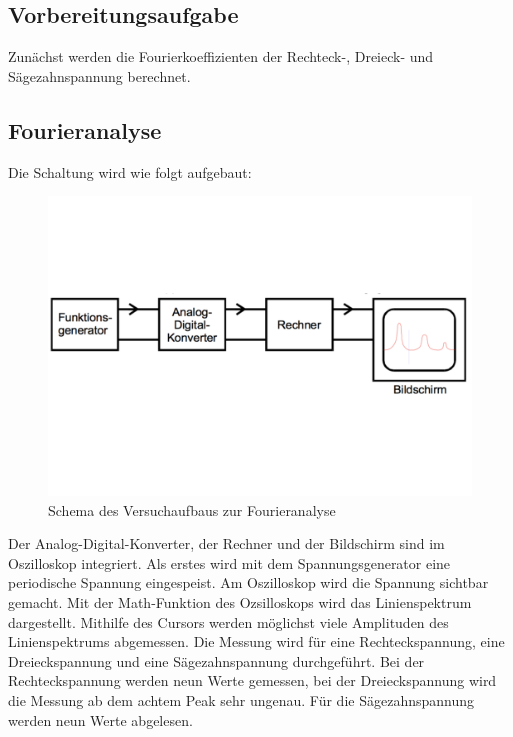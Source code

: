\subsection{Vorbereitungsaufgabe}
Zunächst werden die Fourierkoeffizienten der Rechteck-, Dreieck- und Sägezahnspannung berechnet.

\subsection{Fourieranalyse}
Die Schaltung wird wie folgt aufgebaut:
\begin{figure}[h!]
  \centering
  \includegraphics[width=\textwidth]{transformation.pdf}
  \caption{Schema des Versuchaufbaus zur Fourieranalyse \cite{1}}
  \label{fig:transformation}
\end{figure}
Der Analog-Digital-Konverter, der Rechner und der Bildschirm sind im Oszilloskop integriert.
Als erstes wird mit dem Spannungsgenerator eine periodische Spannung eingespeist.
Am Oszilloskop wird die Spannung sichtbar gemacht.
Mit der Math-Funktion des Ozsilloskops wird das Linienspektrum dargestellt.
Mithilfe des Cursors werden möglichst viele Amplituden des Linienspektrums abgemessen.
Die Messung wird für eine Rechteckspannung, eine Dreieckspannung und eine Sägezahnspannung durchgeführt.
Bei der Rechteckspannung werden neun Werte gemessen, bei der Dreieckspannung wird die Messung ab dem achtem Peak sehr ungenau.
Für die Sägezahnspannung werden neun Werte abgelesen.

